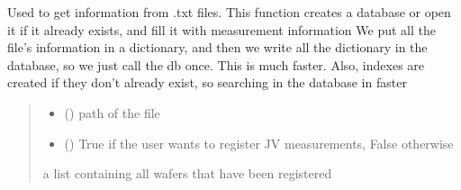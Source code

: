 \documentclass[letterpaper,10pt,english]{sphinxmanual}
\begin{document}
\begin{fulllineitems}
\label{\detokenize{new_manage_DB:new_manage_DB.create_db}}
\pysigstartsignatures
{}
\pysigstopsignatures
\sphinxAtStartPar
Used to get information from .txt files.
This function creates a database or open it if it already exists, and fill it with measurement information
We put all the file’s information in a dictionary, and then we write all the dictionary in the database, so we just call the db once.
This is much faster.
Also, indexes are created if they don’t already exist, so searching in the database in faster
\begin{quote}\begin{description}
\begin{itemize}
\item {} 
\sphinxAtStartPar
{} () \textendash{} path of the file

\item {} 
\sphinxAtStartPar
{} () \textendash{} True if the user wants to register J\sphinxhyphen{}V measurements, False otherwise

\end{itemize}

\sphinxAtStartPar
a list containing all wafers that have been registered

\end{description}\end{quote}

\end{fulllineitems}

\end{document}
